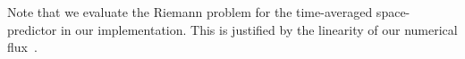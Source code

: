 Note that we evaluate the Riemann problem for the time-averaged space-predictor in our implementation.
This is justified by the linearity of our numerical flux~\cite{dumbser2008unified,dumbser2010arbitrary}.

